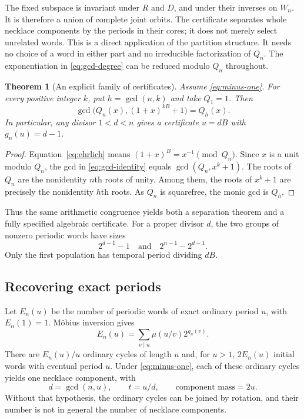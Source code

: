 \documentclass[11pt]{article}
\newtheorem{theorem}{Theorem}[section]
\theoremstyle{definition}
\theoremstyle{remark}
\numberwithin{equation}{section}
\begin{document}
The fixed subspace is invariant under $R$ and $D$, and under their
inverses on $W_n$. It is therefore a union of complete joint orbits.
The certificate separates whole necklace components by the periods in
their cores; it does not merely select unrelated words. This is a direct
application of the partition structure. It needs no choice of a word in
either part and no irreducible factorization of $Q_n$. The exponentiation
in \eqref{eq:gcd-degree} can be reduced modulo $Q_n$ throughout.

\begin{theorem}[An explicit family of certificates]\label{thm:gcd-identity}
Assume \eqref{eq:minus-one}. For every positive integer $k$, put
$h=\gcd(n,k)$ and take $Q_1=1$. Then
\begin{equation}\label{eq:gcd-identity}
 \boxed{\gcd\bigl(Q_n(x),(1+x)^{kB}+1\bigr)=Q_h(x).}
\end{equation}
In particular, any divisor $1<d<n$ gives a certificate $u=dB$ with
$g_n(u)=d-1$.
\end{theorem}

\begin{proof}
Equation~\eqref{eq:ehrlich} means
$(1+x)^B=x^{-1}\pmod{Q_n}$. Since $x$ is a unit modulo $Q_n$,
the gcd in \eqref{eq:gcd-identity} equals $\gcd(Q_n,x^k+1)$.
The roots of $Q_n$ are the nonidentity $n$th roots of unity. Among
them, the roots of $x^k+1$ are precisely the nonidentity $h$th roots.
As $Q_n$ is squarefree, the monic gcd is $Q_h$.
\end{proof}

Thus the same arithmetic congruence yields both a separation theorem
and a fully specified algebraic certificate. For a proper divisor $d$,
the two groups of nonzero periodic words have sizes
\[
 2^{d-1}-1\quad\text{and}\quad2^{n-1}-2^{d-1}.
\]
Only the first population has temporal period dividing $dB$.

\subsection{Recovering exact periods}

Let $E_n(u)$ be the number of periodic words of exact ordinary period
$u$, with $E_n(1)=1$. M\"obius inversion gives
\begin{equation}\label{eq:exact-census}
 E_n(u)=\sum_{v\mid u}\mu(u/v)2^{g_n(v)}.
\end{equation}
There are $E_n(u)/u$ ordinary cycles of length $u$ and, for $u>1$,
$2E_n(u)$ initial words with eventual period $u$.
Under \eqref{eq:minus-one}, each of these ordinary cycles yields one
necklace component, with
\begin{equation}\label{eq:component-from-period}
 d=\gcd(n,u),\qquad t=u/d,\qquad
 \text{component mass}=2u.
\end{equation}
Without that hypothesis, the ordinary cycles can be joined by rotation,
and their number is not in general the number of necklace components.
\end{document}
